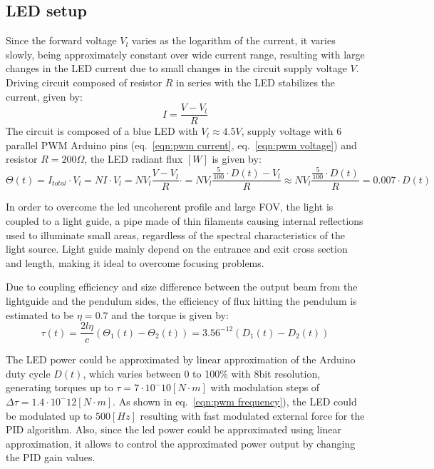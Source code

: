\documentclass[\main/master.tex]{subfiles}
\begin{document}
\subsection{LED setup}
Since the forward voltage $V_l$ varies as the logarithm of the current, it varies slowly, being approximately constant over wide current range, resulting with large changes in the LED current due to small changes in the circuit supply voltage $V$. Driving circuit composed of resistor $R$ in series with the LED stabilizes the current, given by:
\begin{equation}
I =\frac{V-V_l}{R} \label{eqn:led circuit}
\end{equation}
The circuit is composed of a blue LED with $V_l\approx 4.5V$, supply voltage with 6 parallel PWM Arduino pins (eq.~\ref{eqn:pwm current}, eq.~\ref{eqn:pwm voltage}) and resistor $R = 200\Omega$, the LED radiant flux $[W]$ is given by:
\begin{equation}
\Theta(t) = I_{total}\cdot V_l = NI\cdot V_l = N V_l \frac{V-V_l}{R}\cdot  =N V_l\frac{\frac{5}{100}\cdot D(t)-V_l}{R} \approx N V_l\frac{\frac{5}{100}\cdot D(t)}{R} = 0.007\cdot D(t)\label{eqn:led power}
\end{equation}
\par\noindent
In order to overcome the led uncoherent profile and large FOV, the light is coupled to a light guide, a pipe made of thin filaments causing internal reflections used  to illuminate small areas, regardless of the spectral characteristics of the light source. Light guide mainly depend on the entrance and exit cross section and length, making it ideal to overcome focusing problems. 
\par\noindent
Due to coupling efficiency and size difference between the output beam from the lightguide and the pendulum sides, the efficiency of flux hitting the pendulum is estimated to be $\eta = 0.7$ and the torque is given by:
\begin{equation}
\tau(t)  =\frac{2l\eta}{{c}} (\Theta_1(t) -\Theta_2(t)) = 3.56^{-12}(D_1(t) -D_2(t)) 
\label{eqn:led torque}
\end{equation}
\par\noindent
The LED power could be approximated by linear approximation of the Arduino duty cycle $D(t)$, which varies between 0 to 100\% with 8bit resolution, generating torques up to $\tau = 7\cdot10^-{10} [N\cdot m]$ with modulation steps of $\Delta\tau = 1.4\cdot10^-{12} [N\cdot m]$. As shown in eq.~\ref{eqn:pwm frequency}), the LED could be modulated up to $500[Hz]$ resulting with fast modulated external force for the PID algorithm. Also, since the led power could be approximated using linear approximation, it allows to control the approximated power output by changing the PID gain values.  
\end{document}
